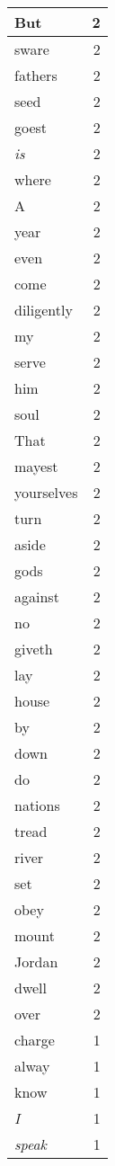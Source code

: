\begin{center}
\begin{longtable}{l|r}
But & 2 \\ \hline
sware & 2 \\ \hline
fathers & 2 \\ \hline
seed & 2 \\ \hline
goest & 2 \\ \hline
\emph{is} & 2 \\ \hline
where & 2 \\ \hline
A & 2 \\ \hline
year & 2 \\ \hline
even & 2 \\ \hline
come & 2 \\ \hline
diligently & 2 \\ \hline
my & 2 \\ \hline
serve & 2 \\ \hline
him & 2 \\ \hline
soul & 2 \\ \hline
That & 2 \\ \hline
mayest & 2 \\ \hline
yourselves & 2 \\ \hline
turn & 2 \\ \hline
aside & 2 \\ \hline
gods & 2 \\ \hline
against & 2 \\ \hline
no & 2 \\ \hline
giveth & 2 \\ \hline
lay & 2 \\ \hline
house & 2 \\ \hline
by & 2 \\ \hline
down & 2 \\ \hline
do & 2 \\ \hline
nations & 2 \\ \hline
tread & 2 \\ \hline
river & 2 \\ \hline
set & 2 \\ \hline
obey & 2 \\ \hline
mount & 2 \\ \hline
Jordan & 2 \\ \hline
dwell & 2 \\ \hline
over & 2 \\ \hline
charge & 1 \\ \hline
alway & 1 \\ \hline
know & 1 \\ \hline
\emph{I} & 1 \\ \hline
\emph{speak} & 1 \\ \hline

\end{longtable}
\end{center}
